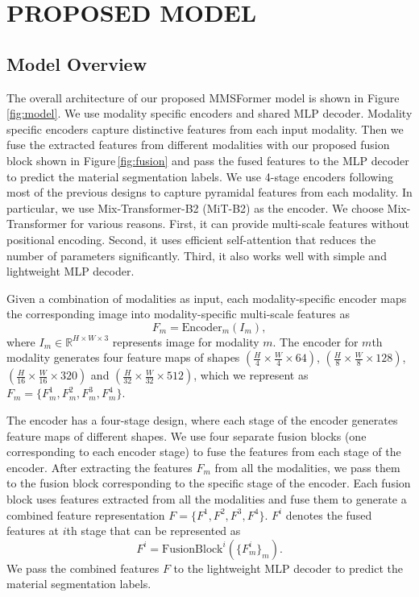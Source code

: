 \documentclass{article}
\begin{document}
\section{PROPOSED MODEL}
\label{sec:proposed-model}

\subsection{Model Overview}
The overall architecture of our proposed MMSFormer model is shown in Figure\,\ref{fig:model}. We use modality specific encoders and shared MLP decoder. Modality specific encoders capture distinctive features from each input modality. Then we fuse the extracted features from different modalities with our proposed fusion block shown in Figure\,\ref{fig:fusion} and pass the fused features to the MLP decoder to predict the material segmentation labels. We use 4-stage encoders following most of the previous designs  \cite{wang2021pvt, xie2021segformer, chen2018deeplabv3+} to capture pyramidal features from each modality. In particular, we use Mix-Transformer-B2 (MiT-B2) \cite{xie2021segformer} as the encoder. We choose Mix-Transformer for various reasons. First, it can provide multi-scale features without positional encoding. Second, it uses efficient self-attention that reduces the number of parameters significantly. Third, it also works well with simple and lightweight MLP decoder.

Given a combination of modalities as input, each modality-specific encoder maps the corresponding image into modality-specific multi-scale features as
\begin{equation}\label{eq:encoder}
    F_m = \text{Encoder}_m(I_m),
\end{equation}
where $I_m \in \mathbb{R}^{H \times W \times 3}$ represents image for modality $m$. The encoder for $m$th modality generates four feature maps of shapes $(\frac{H}{4} \times \frac{W}{4} \times 64)$, $(\frac{H}{8} \times \frac{W}{8} \times 128)$, $(\frac{H}{16} \times \frac{W}{16} \times 320)$ and $(\frac{H}{32} \times \frac{W}{32} \times 512)$, which we represent as $F_m = \{F_m^1, F_m^2, F_m^3, F_m^4\}$.  

The encoder has a four-stage design, where each stage of the encoder generates feature maps of different shapes. We use four separate fusion blocks (one corresponding to each encoder stage) to fuse the features from each stage of the encoder. After extracting the features $F_m$ from all the modalities, we pass them to the fusion block corresponding to the specific stage of the encoder. 
Each fusion block uses features extracted from all the modalities and fuse them to generate a combined feature representation $F = \{F^1, F^2, F^3, F^4\}$. $F^i$ denotes the fused features at $i$th stage that can be represented as 
\begin{equation}\label{eq:fusion}
    F^i = \text{FusionBlock}^i(\{F_m^i\}_m). 
\end{equation}
We pass the combined features $F$ to the lightweight MLP decoder \cite{xie2021segformer} to predict the material segmentation labels. 
\end{document}
